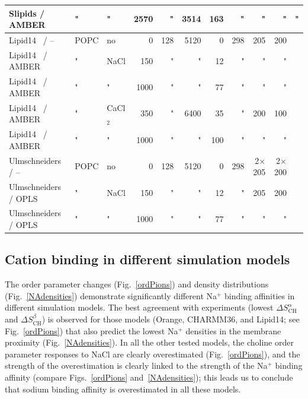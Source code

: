 \documentclass[twoside,twocolumn,9pt]{article}
\begin{document}
\begin{table}[!p]
\begin{minipage}[t]{\textwidth}
\begin{tabular}{l l l r r r r r r r c}
  Slipids\cite{jambeck12} / AMBER\cite{beglov94,roux96} &   " & " & 2570 & " 		& 3514 &  163 & " & " & " & "  \\
  \hline
  Lipid14~\cite{dickson14} / --                        &   POPC & no 		& 0		& 128	& 5120 	& 0 & 298 & 205 & 200 &~\citenum{lipid14POPC0mMNaClfiles}  \\
  Lipid14~\cite{dickson14} / AMBER\cite{aqvist90}   &   " & NaCl & 150	& " 		& " 		& 12 & " & " & " &~\citenum{lipid14POPC150mMNaClfiles}  \\
  Lipid14~\cite{dickson14} / AMBER\cite{aqvist90}   &   " & " 	& 1000 	& " 		& " 		& 77 & " & " & " &~\citenum{lipid14POPC1000mMNaClfiles}  \\
  Lipid14~\cite{dickson14} / AMBER\cite{aqvist90}   &   " & CaCl$_2$ & 350 & " 		& 6400 	& 35 & " & 200 & 100 &~\citenum{lipid14POPC350mMCaClfiles}  \\
  Lipid14~\cite{dickson14} / AMBER\cite{aqvist90}   &   " & " 	& 1000 	& " 		& " 		& 100 & " & " & " &~\citenum{lipid14POPC1000mMCaClfiles}  \\
  \hline
  Ulmschneiders~\cite{Ulmschneider09} / --                           		& POPC 	& no 		& 0		& 128 & 5120 	& 0 & 298 & 2$\times$205 & 2$\times$200 &~\citenum{ulmschneiderPOPC0mMNaClfiles}  \\
  Ulmschneiders~\cite{Ulmschneider09} / OPLS\cite{aqvist90}	&   " 		& NaCl 	& 150 	& " 	  & " 		& 12 & " & 205 & 200 &~\citenum{ulmschneiderPOPC150mMNaClfiles}  \\
  Ulmschneiders~\cite{Ulmschneider09} / OPLS\cite{aqvist90}	&   " 		& " 		& 1000  	& " 	  & " 		& 77 & " & " & " &~\citenum{ulmschneiderPOPC1000mMNaClfiles}  \\
\end{tabular}
\end{minipage}
\end{table}







\subsection{Cation binding in different simulation models}

The order parameter changes (Fig.~\ref{ordPions}) and density distributions (Fig.~\ref{NAdensities})
demonstrate significantly different Na$^+$ binding affinities in different simulation models.
The best agreement with experiments (lowest $\Delta S_\mathrm{CH}^\alpha$ and $\Delta S_\mathrm{CH}^\beta$) is observed for those models (Orange, CHARMM36, and Lipid14; see Fig.~\ref{ordPions}) that also predict the lowest Na$^+$ densities 
in the membrane proximity (Fig.~\ref{NAdensities}).
In all the other tested models, the choline order parameter 
responses to NaCl are clearly overestimated (Fig.~\ref{ordPions}),
and the strength of the overestimation is clearly linked to the strength of the
Na$^+$ binding affinity (compare Figs.~\ref{ordPions} and~\ref{NAdensities});
this leads us to
conclude that sodium binding affinity is overestimated in all these models.
\end{document}
